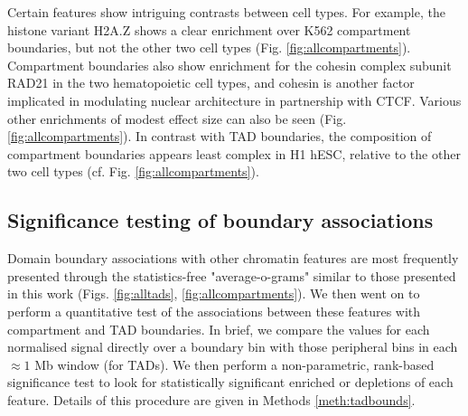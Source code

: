 \documentclass[a4paper,11pt,oneside]{book}
\begin{document}
Certain features show intriguing contrasts between cell types. For example, the
histone variant H2A.Z shows a clear enrichment over K562 compartment boundaries, but not the other two
cell types (Fig. \ref{fig:allcompartments}). Compartment
boundaries also show enrichment for the cohesin complex subunit RAD21
in the two hematopoietic cell types, and cohesin is
another factor implicated in modulating nuclear architecture in
partnership with CTCF.\cite{Zuin2013} Various other enrichments
of modest effect size can also be seen (Fig. \ref{fig:allcompartments}). In contrast with TAD boundaries, the
composition of compartment boundaries appears least complex in H1
hESC, relative to the other two cell types (cf. Fig. \ref{fig:allcompartments}). 

\subsection{Significance testing of boundary associations}\label{sec:boundsignif}

Domain boundary associations with other chromatin features are most frequently presented through the statistics-free "average-o-grams" similar to those presented in this work (Figs. \ref{fig:alltads}, \ref{fig:allcompartments}). We then went on to perform a quantitative test of the associations between these features with compartment and TAD boundaries. In brief, we compare the values for each normalised signal directly over a boundary bin with those peripheral bins in each $\approx 1$ Mb window (for TADs). We then perform a non-parametric, rank-based significance test to look for statistically significant enriched or depletions of each feature. Details of this procedure are given in Methods \ref{meth:tadbounds}.
\end{document}
